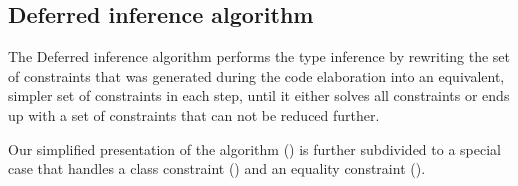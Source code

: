 \FloatBarrier
\subsection{Deferred inference algorithm}

The Deferred inference algorithm performs the type inference by rewriting the set of constraints that was generated during the code elaboration into an equivalent, simpler set of constraints in each step, until it either solves all constraints or ends up with a set of constraints that can not be reduced further. \cite{peytonjones2019type}

Our simplified presentation of the algorithm () is further subdivided to a special case that handles a class constraint () and an equality constraint ().

